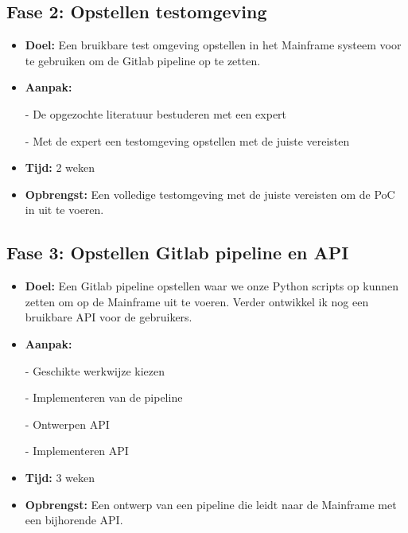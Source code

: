 \subsection{Fase 2: Opstellen testomgeving}
\begin{itemize}
    \item \textbf{Doel:}
    Een bruikbare test omgeving opstellen in het Mainframe systeem voor te gebruiken om de Gitlab pipeline op te zetten.
    \item \textbf{Aanpak:}
    \item[-] De opgezochte literatuur bestuderen met een expert
    \item[-] Met de expert een testomgeving opstellen met de juiste vereisten
    
    \item \textbf{Tijd:} 2 weken
    \item \textbf{Opbrengst:}
    Een volledige testomgeving met de juiste vereisten om de PoC in uit te voeren.
\end{itemize}


\subsection{Fase 3: Opstellen Gitlab pipeline en API}
\begin{itemize}
    \item \textbf{Doel:}
    Een Gitlab pipeline opstellen waar we onze Python scripts op kunnen zetten om op de Mainframe uit te voeren. Verder ontwikkel ik nog een bruikbare API voor de gebruikers.
    \item \textbf{Aanpak:}
    \item[-] Geschikte werkwijze kiezen 
    \item[-] Implementeren van de pipeline
    \item[-] Ontwerpen API
    \item[-] Implementeren API 
    
    \item \textbf{Tijd:} 3 weken
    \item \textbf{Opbrengst:}
    Een ontwerp van een pipeline die leidt naar de Mainframe met een bijhorende API.
\end{itemize}


